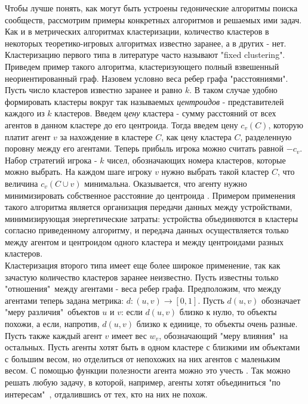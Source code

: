 Чтобы лучше понять, как могут быть устроены гедонические алгоритмы поиска сообществ, рассмотрим примеры конкретных алгоритмов и решаемых ими задач. Как и в метрических алгоритмах кластеризации, количество кластеров в некоторых теоретико-игровых алгоритмах известно заранее, а в других - нет.\\

Кластеризацию первого типа в литературе часто называют "fixed clustering". Приведем пример такого алгоритма, кластеризующего полный взвешенный неориентированный граф. Назовем условно веса ребер графа "расстояниями". Пусть число кластеров известно заранее и равно $k$. В таком случае удобно формировать кластеры вокруг так называемых \textit{центроидов} - представителей каждого из $k$ кластеров. Введем \textit{цену} кластера - сумму расстояний от всех агентов в данном кластере до его центроида. Тогда введем цену $c_v(C)$, которую платит агент $v$ за нахождение в кластере $C$, как цену кластера $C$, разделенную поровну между его агентами. Теперь прибыль игрока можно считать равной $-c_v$. Набор стратегий игрока - $k$ чисел, обозначающих номера кластеров, которые можно выбрать. На каждом шаге игроку $v$ нужно выбрать такой кластер $C$, что величина $c_v(C\cup v)$ минимальна. Оказывается, что агенту нужно минимизировать собственное расстояние до центроида \cite{clusteringhg}. Примером применения такого алгоритма является организация передачи данных между устройствами, минимизирующая энергетические затраты: устройства объединяются в кластеры согласно приведенному алгоритму, и передача данных осуществляется только между агентом и центроидом одного кластера и между центроидами разных кластеров.\\

Кластеризация второго типа имеет еще более широкое применение, так как зачастую количество кластеров заранее неизвестно. Пусть известны только "отношения"\ между агентами - веса ребер графа. Предположим, что между агентами теперь задана метрика: $d:(u, v)\rightarrow [0,1]$. Пусть $d(u, v)$ обозначает "меру различия"\ объектов $u$ и $v$: если $d(u, v)$ близко к нулю, то объекты похожи, а если, напротив, $d(u, v)$ близко к единице, то объекты очень разные. Пусть также каждый агент $v$ имеет вес $w_v$, обозначающий "меру влияния"\ на остальных. Пусть агенты хотят быть в одном кластере с близкими им объектами с большим весом, но отделиться от непохожих на них агентов с маленьким весом. С помощью функции полезности агента можно это учесть \cite{clusteringhg}. Так можно решать любую задачу, в которой, например, агенты хотят объединиться "по интересам"\ , отдалившись от тех, кто на них не похож.\\


